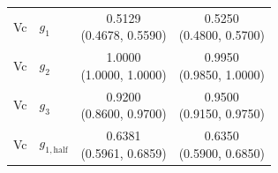 \begin{tabular}{llcc}
Vc & $g_1$ & \shortstack{0.5129\\(0.4678, 0.5590)} & \shortstack{0.5250\\(0.4800, 0.5700)} \\[3pt]
Vc & $g_2$ & \shortstack{1.0000\\(1.0000, 1.0000)} & \shortstack{0.9950\\(0.9850, 1.0000)} \\[3pt]
Vc & $g_3$ & \shortstack{0.9200\\(0.8600, 0.9700)} & \shortstack{0.9500\\(0.9150, 0.9750)} \\[3pt]
Vc & $g_{1,\mathrm{half}}$ & \shortstack{0.6381\\(0.5961, 0.6859)} & \shortstack{0.6350\\(0.5900, 0.6850)} \\[3pt]
\bottomrule
\end{tabular}
